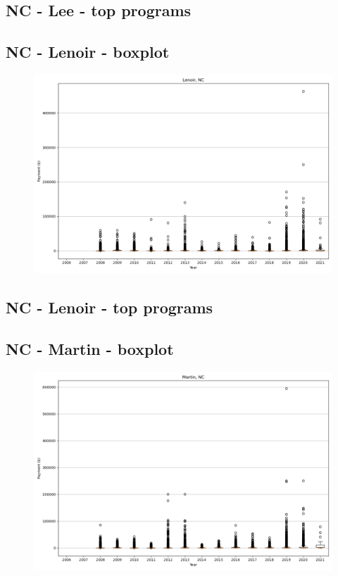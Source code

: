 \subsection*{NC - Lee - top programs}

\newpage
\subsection*{NC - Lenoir - boxplot}
\begin{figure}[h]
\centering
\includegraphics[width=7in]{../output/boxplots/counties/Lenoir-NC_boxplot.png}
\end{figure}


\subsection*{NC - Lenoir - top programs}

\newpage
\subsection*{NC - Martin - boxplot}
\begin{figure}[h]
\centering
\includegraphics[width=7in]{../output/boxplots/counties/Martin-NC_boxplot.png}
\end{figure}


